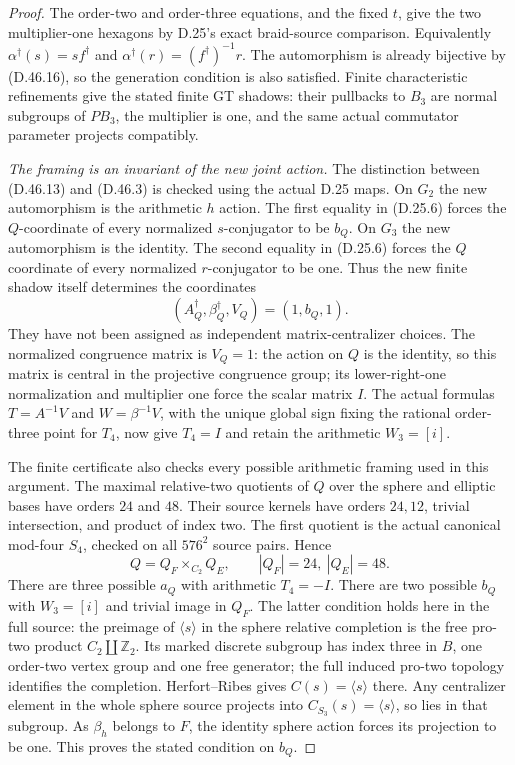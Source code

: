 \begin{proof}
The order-two and
order-three equations,
and the fixed \(t\),
give the two multiplier-one
hexagons by D.25's exact
braid-source comparison.
Equivalently
\(\alpha^\dagger(s)=s f^\dagger\)
and
\(\alpha^\dagger(r)=(f^\dagger)^{-1}r\).
The automorphism is
already bijective by
(D.46.16), so the
generation condition is
also satisfied. Finite
characteristic refinements
give the stated finite
GT shadows: their
pullbacks to \(B_3\)
are normal subgroups
of \(PB_3\), the
multiplier is one,
and the same actual
commutator parameter
projects compatibly.

\emph{The framing is an invariant of the new joint action.}
The distinction between
(D.46.13) and (D.46.3)
is checked using the
actual D.25 maps.
On \(G_2\) the new
automorphism is the
arithmetic \(h\) action.
The first equality in
(D.25.6) forces the
\(Q\)-coordinate of
every normalized
\(s\)-conjugator to
be \(b_Q\).
On \(G_3\) the new
automorphism is the
identity. The second
equality in (D.25.6)
forces the \(Q\)
coordinate of every
normalized \(r\)-conjugator
to be one.
Thus the new finite
shadow itself determines
the coordinates
\[
                 (A_Q^\dagger,\beta_Q^\dagger,V_Q)
                                  =(1,b_Q,1).                 \tag{D.46.21}
\]
They have not been
assigned as independent
matrix-centralizer choices.
The normalized congruence
matrix is \(V_Q=1\):
the action on \(Q\) is
the identity, so this
matrix is central in
the projective congruence
group; its lower-right-one
normalization and
multiplier one force
the scalar matrix \(I\).
The actual formulas
\(T=A^{-1}V\) and
\(W=\beta^{-1}V\),
with the unique global
sign fixing the rational
order-three point for
\(T_4\), now give
\(T_4=I\) and retain
the arithmetic
\(W_3=[i]\).

The finite certificate
also checks every
possible arithmetic
framing used in this
argument. The maximal
relative-two quotients
of \(Q\) over the
sphere and elliptic
bases have orders
\(24\) and \(48\).
Their source kernels
have orders \(24,12\),
trivial intersection,
and product of index
two. The first quotient
is the actual canonical
mod-four \(S_4\), checked
on all \(576^2\)
source pairs. Hence
\[
               Q=Q_F\times_{C_2}Q_E,\qquad
                       |Q_F|=24,\ |Q_E|=48.                  \tag{D.46.22}
\]
There are three possible
\(a_Q\) with arithmetic
\(T_4=-I\).
There are two possible
\(b_Q\) with
\(W_3=[i]\) and trivial
image in \(Q_F\).
The latter condition
holds here in the full
source: the preimage of
\(\langle s\rangle\)
in the sphere relative
completion is the free
pro-two product
\(C_2\amalg\mathbb Z_2\).
Its marked discrete
subgroup has index
three in \(B\), one
order-two vertex group
and one free generator;
the full induced pro-two
topology identifies the
completion. Herfort--Ribes
\cite[Theorem B$'$]{A_HerfortRibes1985}
gives \(C(s)=\langle s\rangle\)
there. Any centralizer
element in the whole
sphere source projects
into \(C_{S_3}(s)=\langle s\rangle\),
so lies in that subgroup.
As \(\beta_{h}\) belongs
to \(F\), the identity
sphere action forces
its projection to be
one. This proves the
stated condition on
\(b_Q\).


\end{proof}
